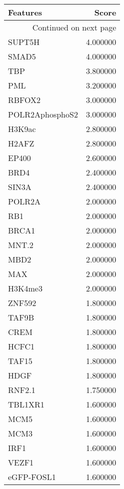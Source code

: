 \begin{longtable}{lr}
\caption{}\\
\toprule
        Features &     Score \\
\midrule
\endhead
\midrule
\multicolumn{2}{r}{{Continued on next page}} \\
\midrule
\endfoot

\bottomrule
\endlastfoot
          SUPT5H &  4.000000 \\
           SMAD5 &  4.000000 \\
             TBP &  3.800000 \\
             PML &  3.200000 \\
          RBFOX2 &  3.000000 \\
 POLR2AphosphoS2 &  3.000000 \\
          H3K9ac &  2.800000 \\
           H2AFZ &  2.800000 \\
           EP400 &  2.600000 \\
            BRD4 &  2.400000 \\
           SIN3A &  2.400000 \\
          POLR2A &  2.000000 \\
             RB1 &  2.000000 \\
           BRCA1 &  2.000000 \\
           MNT.2 &  2.000000 \\
            MBD2 &  2.000000 \\
             MAX &  2.000000 \\
         H3K4me3 &  2.000000 \\
          ZNF592 &  1.800000 \\
           TAF9B &  1.800000 \\
            CREM &  1.800000 \\
           HCFC1 &  1.800000 \\
           TAF15 &  1.800000 \\
            HDGF &  1.800000 \\
          RNF2.1 &  1.750000 \\
         TBL1XR1 &  1.600000 \\
            MCM5 &  1.600000 \\
            MCM3 &  1.600000 \\
            IRF1 &  1.600000 \\
           VEZF1 &  1.600000 \\
      eGFP-FOSL1 &  1.600000 \\

\end{longtable}
